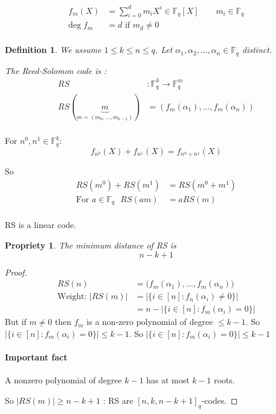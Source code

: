 \documentclass{article}
\newtheorem{prop}{Propriety}
\newtheorem{defi}{Definition}
\begin{document}
\begin{align*}
f_m(X) & =\sum_{i=0}^d m_iX^i \in \mathbb{F}_q[X] \qquad m_i\in \mathbb{F}_q \\
\text{deg}\; f_m & = d \text{ if }m_d\neq 0\\
\end{align*}

\begin{defi}
We assume $1\leq k \leq n \leq q$. Let $\alpha_1, \alpha_2, ..., \alpha_n \in \mathbb{F}_q$ distinct.

The Reed-Solomon code is :
\begin{align*}
RS &: \mathbb{F}_q^k \to \mathbb{F}_q^m\\
RS(\underbrace{m}_{m=(m_0,...,m_{k-1})}) & = (f_m(\alpha_1),...,f_m(\alpha_n) )\\
\end{align*}
\end{defi}

For $n^0, n^1 \in \mathbb{F}_q^k$:
\[f_{n^0}(X) + f_{n^1}(X) = f_{n^0 + n^1}(X)\]

So 
\begin{align*}
RS(m^0) + RS(m^1) & = RS(m^0 + m^1)\\
\text{For $a\in \mathbb{F}_q$ } RS(am) &= aRS(m)\\
\end{align*}

RS is a linear code.

\begin{prop}
The minimum distance of RS is
\[n-k+1\]
\end{prop}

\begin{proof}
\begin{align*}
RS(n) & = \big( f_m(\alpha_1),...,f_m(\alpha_n) \big)\\
\text{Weight: } |RS(m)|&= | \{ i\in [n] : f_n(\alpha_i)\neq 0 \} |\\
& = n - |\{ i \in [n]: f_m(\alpha_i) = 0\}|
\end{align*}
But if $m\neq 0$ then $f_m$ is a non-zero polynomial of degree $\leq k-1$. So $|\{ i \in [n]: f_m(\alpha_i) = 0 \} | \leq k-1$. So $|\{i \in [n] : f_m(\alpha_i)=0\}|\leq k-1$

\paragraph{Important fact} A nonzero polynomial of degree $k-1$ has at most $k-1$ roots.

So $|RS(m)|\geq n-k+1$ : RS are $[n,k,n-k+1]_q$-codes.
\end{proof}
\end{document}
